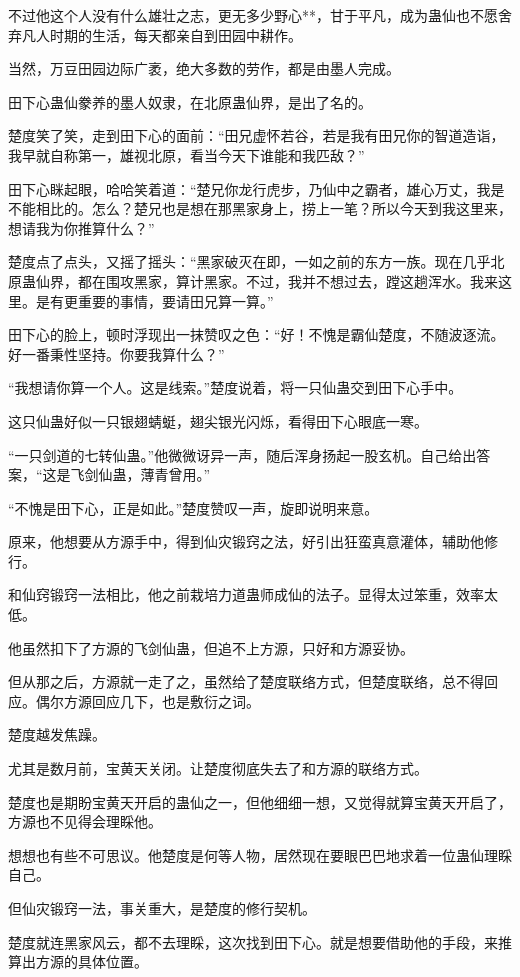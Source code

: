 \begin{this_body}
不过他这个人没有什么雄壮之志，更无多少野心**，甘于平凡，成为蛊仙也不愿舍弃凡人时期的生活，每天都亲自到田园中耕作。

当然，万豆田园边际广袤，绝大多数的劳作，都是由墨人完成。

田下心蛊仙豢养的墨人奴隶，在北原蛊仙界，是出了名的。

楚度笑了笑，走到田下心的面前：“田兄虚怀若谷，若是我有田兄你的智道造诣，我早就自称第一，雄视北原，看当今天下谁能和我匹敌？”

田下心眯起眼，哈哈笑着道：“楚兄你龙行虎步，乃仙中之霸者，雄心万丈，我是不能相比的。怎么？楚兄也是想在那黑家身上，捞上一笔？所以今天到我这里来，想请我为你推算什么？”

楚度点了点头，又摇了摇头：“黑家破灭在即，一如之前的东方一族。现在几乎北原蛊仙界，都在围攻黑家，算计黑家。不过，我并不想过去，蹚这趟浑水。我来这里。是有更重要的事情，要请田兄算一算。”

田下心的脸上，顿时浮现出一抹赞叹之色：“好！不愧是霸仙楚度，不随波逐流。好一番秉性坚持。你要我算什么？”

“我想请你算一个人。这是线索。”楚度说着，将一只仙蛊交到田下心手中。

这只仙蛊好似一只银翅蜻蜓，翅尖银光闪烁，看得田下心眼底一寒。

“一只剑道的七转仙蛊。”他微微讶异一声，随后浑身扬起一股玄机。自己给出答案，“这是飞剑仙蛊，薄青曾用。”

“不愧是田下心，正是如此。”楚度赞叹一声，旋即说明来意。

原来，他想要从方源手中，得到仙灾锻窍之法，好引出狂蛮真意灌体，辅助他修行。

和仙窍锻窍一法相比，他之前栽培力道蛊师成仙的法子。显得太过笨重，效率太低。

他虽然扣下了方源的飞剑仙蛊，但追不上方源，只好和方源妥协。

但从那之后，方源就一走了之，虽然给了楚度联络方式，但楚度联络，总不得回应。偶尔方源回应几下，也是敷衍之词。

楚度越发焦躁。

尤其是数月前，宝黄天关闭。让楚度彻底失去了和方源的联络方式。

楚度也是期盼宝黄天开启的蛊仙之一，但他细细一想，又觉得就算宝黄天开启了，方源也不见得会理睬他。

想想也有些不可思议。他楚度是何等人物，居然现在要眼巴巴地求着一位蛊仙理睬自己。

但仙灾锻窍一法，事关重大，是楚度的修行契机。

楚度就连黑家风云，都不去理睬，这次找到田下心。就是想要借助他的手段，来推算出方源的具体位置。


\end{this_body}
